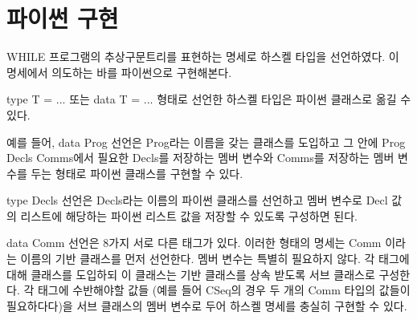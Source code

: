 \documentclass[a4paper]{book}
\begin{document}


\section{파이썬 구현}

WHILE 프로그램의 추상구문트리를 표현하는 명세로 하스켈 타입을
선언하였다. 이 명세에서 의도하는 바를 파이썬으로 구현해본다.

type T = ... 또는 data T = ... 형태로 선언한 하스켈 타입은 파이썬
클래스로 옮길 수 있다.

예를 들어, data Prog 선언은 Prog라는 이름을 갖는 클래스를 도입하고 그
안에 Prog Decls Comms에서 필요한 Decls를 저장하는 멤버 변수와 Comms를
저장하는 멤버 변수를 두는 형태로 파이썬 클래스를 구현할 수 있다.

type Decls 선언은 Decls라는 이름의 파이썬 클래스를 선언하고 멤버
변수로 Decl 값의 리스트에 해당하는 파이썬 리스트 값을 저장할 수 있도록
구성하면 된다.

data Comm 선언은 8가지 서로 다른 태그가 있다. 이러한 형태의 명세는
Comm 이라는 이름의 기반 클래스를 먼저 선언한다. 멤버 변수는 특별히
필요하지 않다. 각 태그에 대해 클래스를 도입하되 이 클래스는 기반
클래스를 상속 받도록 서브 클래스로 구성한다. 각 태그에 수반해야할 값들
(예를 들어 CSeq의 경우 두 개의 Comm 타입의 값들이 필요하다다)을 서브
클래스의 멤버 변수로 두어 하스켈 명세를 충실히 구현할 수 있다.
\end{document}
